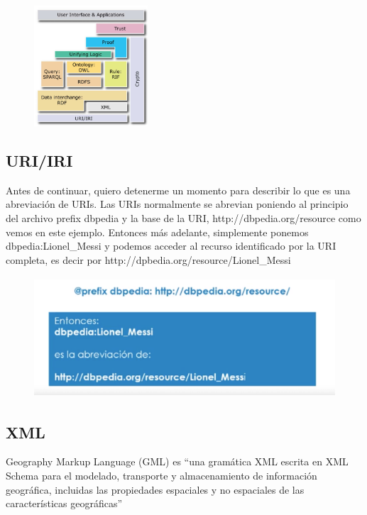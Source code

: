 \begin{figure}[H]
	\centering
	\includegraphics[height=4.5cm]{imagenes/capitulo3/11} %
	\caption{}
	\label{}
\end{figure}

\subsection{URI/IRI}

Antes de continuar, quiero detenerme un momento para describir lo que es una abreviación de URIs. Las URIs normalmente se abrevian poniendo al principio del archivo prefix dbpedia y la base de la URI, http://dbpedia.org/resource como vemos en este ejemplo. Entonces más adelante, simplemente ponemos dbpedia:Lionel_Messi y podemos acceder al recurso identificado por la URI completa, es decir por http://dpbedia.org/resource/Lionel_Messi

\begin{figure}[H]
	\centering
	\includegraphics[height=4.5cm]{imagenes/capitulo3/13} 
	\caption{}
	\label{}
\end{figure}

\subsection{XML}

Geography Markup Language (GML) es “una gramática XML escrita en XML Schema para el modelado, transporte y almacenamiento de información geográfica, incluidas las propiedades espaciales y no espaciales de las características geográficas”

